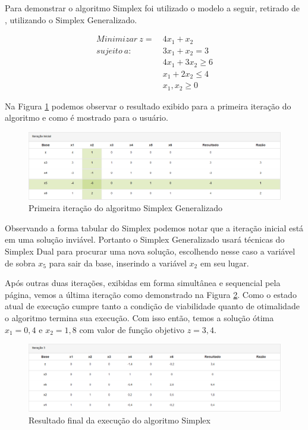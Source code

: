 \documentclass [11pt]{articleSBPO}
\begin{document}
Para demonstrar o algoritmo Simplex foi utilizado o modelo a seguir, retirado de \cite{taha}, utilizando o Simplex Generalizado.

\begin{equation*}
	\begin{split}
		Minimizar\ z =\ & 4x_{1} + x_{2} \\
		sujeito\ a:\ \ \ \ &  3x_{1} + x_{2} = 3 \\
		& 4x_{1} + 3x_{2} \geq 6 \\
		& x_{1} + 2x_{2} \leq 4 \\
		& x_{1}, x_{2} \geq 0
	\end{split}
\end{equation*}

Na Figura \ref{fig:simplexit1} podemos observar o resultado exibido para a primeira iteração do algoritmo e como é mostrado para o usuário.

\begin{figure}[!h]
	\centering
	\includegraphics[width=1\textwidth]{img/simplexit1.png}
	\caption[]{Primeira iteração do algoritmo Simplex Generalizado}
	\label{fig:simplexit1}
\end{figure}

Observando a forma tabular do Simplex podemos notar que a iteração inicial está em uma solução inviável. Portanto o Simplex Generalizado usará técnicas do Simplex Dual para procurar uma nova solução, escolhendo nesse caso a variável de sobra $x_{5}$ para sair da base, inserindo a variável $x_{2}$ em seu lugar.

Após outras duas iterações, exibidas em forma simultânea e sequencial pela página, vemos a última iteração como demonstrado na Figura \ref{fig:simplexit3}. Como o estado atual de execução cumpre tanto a condição de viabilidade quanto de otimalidade o algoritmo termina sua execução. Com isso então, temos a solução ótima $x_{1}=0,4$ e $x_{2}=1,8$ com valor de função objetivo $z = 3,4$.

\begin{figure}[!h]
	\centering
	\includegraphics[width=1\textwidth]{img/simplexit3.png}
	\caption[]{Resultado final da execução do algoritmo Simplex}
	\label{fig:simplexit3}
\end{figure}
\end{document}
